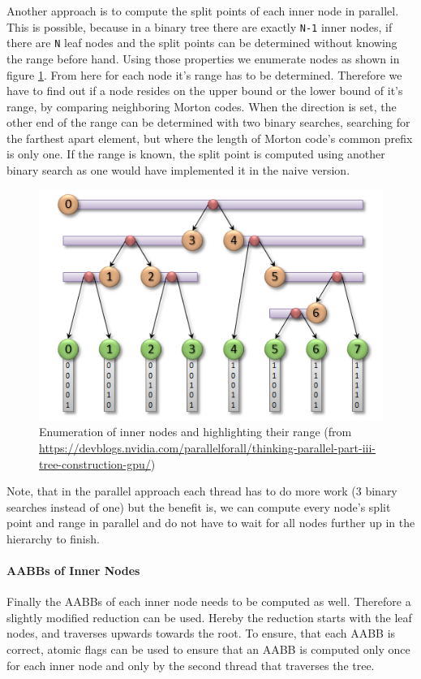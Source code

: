 \documentclass[letterpaper, 10 pt, conference]{IEEEconf}  %
\begin{document}
Another approach is to compute the split points of each inner node in parallel. This is possible, because in a binary tree there are exactly \texttt{N-1} inner nodes, if there are \texttt{N} leaf nodes and the split points can be determined without knowing the range before hand. Using those properties we enumerate nodes as shown in figure \ref{fig:nodes}. From here for each node it's range has to be determined. Therefore we have to find out if a node resides on the upper bound or the lower bound of it's range, by comparing neighboring Morton codes. When the direction is set, the other end of the range can be determined with two binary searches, searching for the farthest apart element, but where the length of Morton code's common prefix is only one. If the range is known, the split point is computed using another binary search as one would have implemented it in the naive version. 
\begin{figure}[!th]
   \centering
   \label{fig:nodes}
   \includegraphics[width=0.8\linewidth]{figures/nodes.png}
   \caption{Enumeration of inner nodes and highlighting their range (from \url{https://devblogs.nvidia.com/parallelforall/thinking-parallel-part-iii-tree-construction-gpu/})}
\end{figure}


Note, that in the parallel approach each thread has to do more work (3 binary searches instead of one) but the benefit is, we can compute every node's split point and range in parallel and do not have to wait for all nodes further up in the hierarchy to finish.

\paragraph{AABBs of Inner Nodes}
Finally the AABBs of each inner node needs to be computed as well. Therefore a slightly modified reduction can be used. Hereby the reduction starts with the leaf nodes, and traverses upwards towards the root. To ensure, that each AABB is correct, atomic flags can be used to ensure that an AABB is computed only once for each inner node and only by the second thread that traverses the tree.
\end{document}

